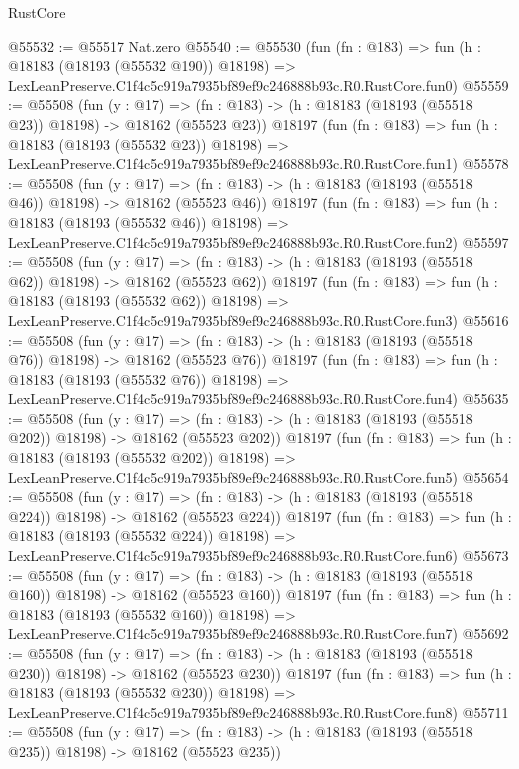 \begin{lexlean}{RustCore}
\begin{coremodule}
@55532 := @55517 Nat.zero
@55540 := @55530
    (fun (fn : @183) =>
    fun (h : @18183 (@18193 (@55532 @190)) @18198) =>
    LexLeanPreserve.C1f4c5c919a7935bf89ef9c246888b93c.R0.RustCore.fun0)
@55559 := @55508
    (fun (y : @17) =>
    (fn : @183) -> (h : @18183 (@18193 (@55518 @23)) @18198) -> @18162 (@55523 @23))
    @18197
    (fun (fn : @183) =>
    fun (h : @18183 (@18193 (@55532 @23)) @18198) =>
    LexLeanPreserve.C1f4c5c919a7935bf89ef9c246888b93c.R0.RustCore.fun1)
@55578 := @55508
    (fun (y : @17) =>
    (fn : @183) -> (h : @18183 (@18193 (@55518 @46)) @18198) -> @18162 (@55523 @46))
    @18197
    (fun (fn : @183) =>
    fun (h : @18183 (@18193 (@55532 @46)) @18198) =>
    LexLeanPreserve.C1f4c5c919a7935bf89ef9c246888b93c.R0.RustCore.fun2)
@55597 := @55508
    (fun (y : @17) =>
    (fn : @183) -> (h : @18183 (@18193 (@55518 @62)) @18198) -> @18162 (@55523 @62))
    @18197
    (fun (fn : @183) =>
    fun (h : @18183 (@18193 (@55532 @62)) @18198) =>
    LexLeanPreserve.C1f4c5c919a7935bf89ef9c246888b93c.R0.RustCore.fun3)
@55616 := @55508
    (fun (y : @17) =>
    (fn : @183) -> (h : @18183 (@18193 (@55518 @76)) @18198) -> @18162 (@55523 @76))
    @18197
    (fun (fn : @183) =>
    fun (h : @18183 (@18193 (@55532 @76)) @18198) =>
    LexLeanPreserve.C1f4c5c919a7935bf89ef9c246888b93c.R0.RustCore.fun4)
@55635 := @55508
    (fun (y : @17) =>
    (fn : @183) -> (h : @18183 (@18193 (@55518 @202)) @18198) -> @18162 (@55523 @202))
    @18197
    (fun (fn : @183) =>
    fun (h : @18183 (@18193 (@55532 @202)) @18198) =>
    LexLeanPreserve.C1f4c5c919a7935bf89ef9c246888b93c.R0.RustCore.fun5)
@55654 := @55508
    (fun (y : @17) =>
    (fn : @183) -> (h : @18183 (@18193 (@55518 @224)) @18198) -> @18162 (@55523 @224))
    @18197
    (fun (fn : @183) =>
    fun (h : @18183 (@18193 (@55532 @224)) @18198) =>
    LexLeanPreserve.C1f4c5c919a7935bf89ef9c246888b93c.R0.RustCore.fun6)
@55673 := @55508
    (fun (y : @17) =>
    (fn : @183) -> (h : @18183 (@18193 (@55518 @160)) @18198) -> @18162 (@55523 @160))
    @18197
    (fun (fn : @183) =>
    fun (h : @18183 (@18193 (@55532 @160)) @18198) =>
    LexLeanPreserve.C1f4c5c919a7935bf89ef9c246888b93c.R0.RustCore.fun7)
@55692 := @55508
    (fun (y : @17) =>
    (fn : @183) -> (h : @18183 (@18193 (@55518 @230)) @18198) -> @18162 (@55523 @230))
    @18197
    (fun (fn : @183) =>
    fun (h : @18183 (@18193 (@55532 @230)) @18198) =>
    LexLeanPreserve.C1f4c5c919a7935bf89ef9c246888b93c.R0.RustCore.fun8)
@55711 := @55508
    (fun (y : @17) =>
    (fn : @183) -> (h : @18183 (@18193 (@55518 @235)) @18198) -> @18162 (@55523 @235))

\end{coremodule}
\end{lexlean}
